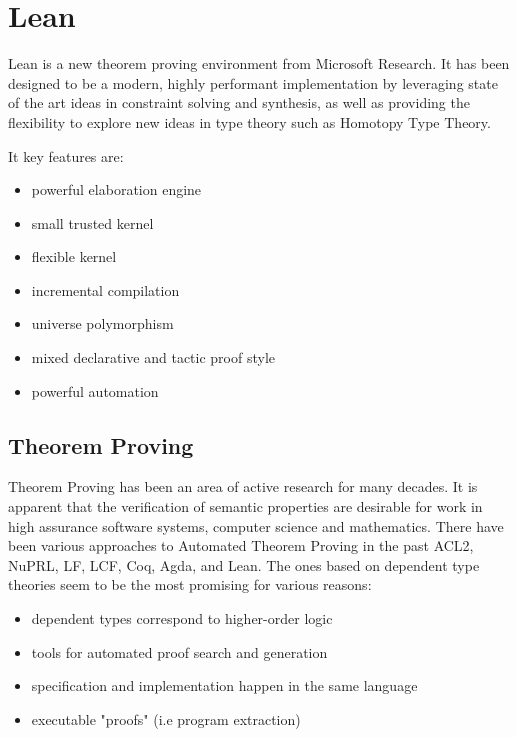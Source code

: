 \section{Lean}

Lean is a new theorem proving environment from Microsoft Research. It has
been designed to be a modern, highly performant implementation by leveraging
state of the art ideas in constraint solving and synthesis, as well as
providing the flexibility to explore new ideas in type theory such as
Homotopy Type Theory\cite{HoTTbook}.

It key features are:\\
\begin{itemize}
    \item powerful elaboration engine
    \item small trusted kernel
    \item flexible kernel
    \item incremental compilation
    \item universe polymorphism
    \item mixed declarative and tactic proof style
    \item powerful automation\\
\end{itemize}

\subsection{Theorem Proving}

Theorem Proving has been an area of active research for many decades. It is
apparent that the  verification of semantic properties are desirable for
work in high assurance software systems, computer science and mathematics.
There have been various approaches to Automated Theorem Proving in the past ACL2,
NuPRL, LF, LCF, Coq, Agda, and Lean. The ones based on dependent type
theories seem to be the most promising for various reasons:\\

\begin{itemize}
    \item dependent types correspond to higher-order logic
    \item tools for automated proof search and generation
    \item specification and implementation happen in the same language
    \item executable "proofs" (i.e program extraction)\\
\end{itemize}

